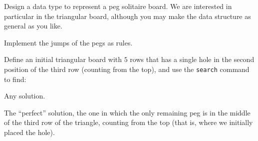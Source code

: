 \begin{listaejercicios}

\item
Design a data type to represent a peg solitaire board. We are interested in
particular in the triangular board, although you may make the data structure
as general as you like.

\item
Implement the jumps of the pegs as rules.

\item
Define an initial triangular board with $5$ rows that has a single hole in
the second position of the third row (counting from the top), and use the
\verb"search" command to find:
\begin{listaalph}
\item
Any solution.

\item
The ``perfect'' solution, the one in which the only remaining peg is in the
middle of the third row of the triangle, counting from the top (that is,
where we initially placed the hole).
\end{listaalph}

%

%

\end{listaejercicios}


